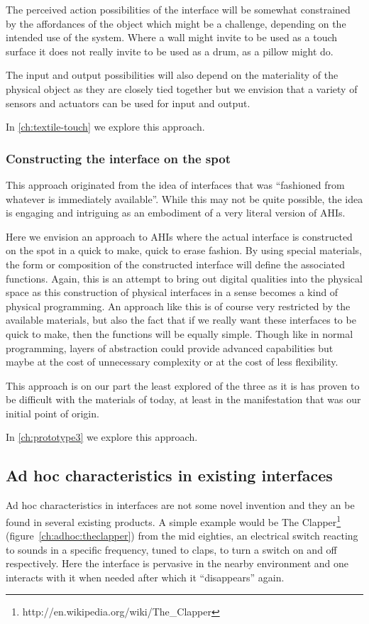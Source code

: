 The perceived action possibilities of the interface will be somewhat constrained by the affordances of the object which might be a challenge, depending on the intended use of the system.
Where a wall might invite to be used as a touch surface it does not really invite to be used as a drum, as a pillow might do.

The input and output possibilities will also depend on the materiality of the physical object as they are closely tied together but we envision that a variety of sensors and actuators can be used for input and output.

In \autoref{ch:textile-touch} we explore this approach.

\subsubsection{Constructing the interface on the spot}
This approach originated from the idea of interfaces that was ``fashioned from whatever is immediately available''.
While this may not be quite possible, the idea is engaging and intriguing as an embodiment of a very literal version of AHIs.

Here we envision an approach to AHIs where the actual interface is constructed on the spot in a quick to make, quick to erase fashion.
By using special materials, the form or composition of the constructed interface will define the associated functions.
Again, this is an attempt to bring out digital qualities into the physical space as this construction of physical interfaces in a sense becomes a kind of physical programming.
An approach like this is of course very restricted by the available materials, but also the fact that if we really want these interfaces to be quick to make, then the functions will be equally simple.
Though like in normal programming, layers of abstraction could provide advanced capabilities but maybe at the cost of unnecessary complexity or at the cost of less flexibility.

This approach is on our part the least explored of the three as it is has proven to be difficult with the materials of today, at least in the manifestation that was our initial point of origin. 

In \ref{ch:prototype3} we explore this approach.

\subsection{Ad hoc characteristics in existing interfaces}
Ad hoc characteristics in interfaces are not some novel invention and they an be found in several existing products.
A simple example would be The Clapper\footnote{http://en.wikipedia.org/wiki/The\_Clapper} (figure~\ref{ch:adhoc:theclapper}) from the mid eighties, an electrical switch reacting to sounds in a specific frequency, tuned to claps, to turn a switch on and off respectively.
Here the interface is pervasive in the nearby environment and one interacts with it when needed after which it ``disappears'' again.


